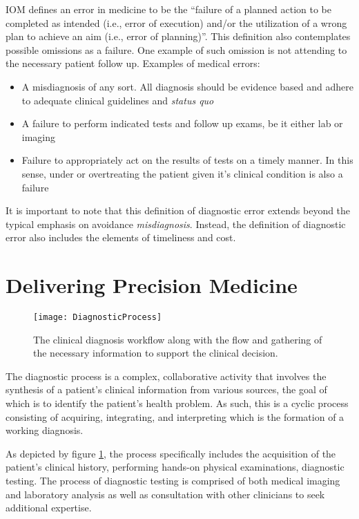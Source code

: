 IOM defines an error in medicine to be the “failure of a planned action to be completed as intended (i.e., error of execution) and/or the utilization of a wrong plan to achieve an aim (i.e., error of planning)”\cite{iom2004}. This definition also contemplates possible omissions as a failure. One example of such omission is not attending to the necessary patient follow up. Examples of medical errors:

\begin{itemize}
\item A misdiagnosis of any sort. All diagnosis should be evidence based and adhere to adequate clinical guidelines and \emph{status quo}
\item A failure to perform indicated tests and follow up exams, be it either lab or imaging
\item Failure to appropriately act on the results of tests on a timely manner. In this sense, under or overtreating the patient given it's clinical condition is also a failure
\end{itemize}

It is important to note that this definition of diagnostic error extends beyond the typical emphasis on avoidance \emph{misdiagnosis}. Instead, the definition of diagnostic error also includes the elements of timeliness and cost.

\section{Delivering Precision Medicine}

\begin{figure}
\begin{centering}
\texttt{[image: DiagnosticProcess]}
\par\end{centering}
\caption{\label{fig:DiagnosticProcess}The clinical diagnosis workflow along with the flow and gathering of the necessary information to support the clinical decision\cite{parasuraman2000}.}
\end{figure}

The diagnostic process is a complex, collaborative activity that involves the synthesis of a patient’s clinical information from various sources, the goal of which is to identify the patient’s health problem. As such, this is a cyclic process consisting of acquiring, integrating, and interpreting which is the formation of a working diagnosis. 

As depicted by figure \ref{fig:DiagnosticProcess}, the process specifically includes the acquisition of the patient’s clinical history, performing hands-on physical examinations, diagnostic testing. The process of diagnostic testing is comprised of both medical imaging and laboratory analysis as well as consultation with other clinicians to seek additional expertise.

